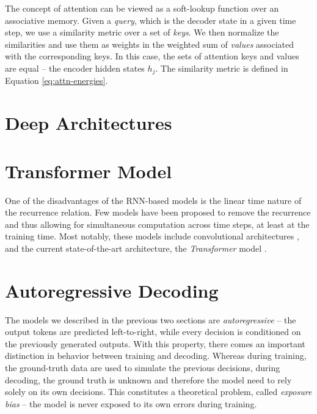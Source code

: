 The concept of attention can be viewed as a soft-lookup function over an
associative memory. Given a \emph{query}, which is the decoder state in a given
time step, we use a similarity metric over a set of \emph{keys}. We then
normalize the similarities and use them as weights in the weighted sum of
\emph{values} associated with the corresponding keys. In this case, the sets of
attention keys and values are equal -- the encoder hidden states $h_j$. The
similarity metric is defined in Equation \ref{eq:attn-energies}.


\section{Deep Architectures}
\label{sec:deep}


\section{Transformer Model}
\label{sec:transformer}

One of the disadvantages of the RNN-based models is the linear time nature of
the recurrence relation. Few models have been proposed to remove the recurrence
and thus allowing for simultaneous computation across time steps, at least at
the training time. Most notably, these models include convolutional
architectures \citep{gehring2017convolutional}, and the current state-of-the-art
architecture, the \emph{Transformer} model \citep{vaswani2017attention}.






\section{Autoregressive Decoding}
\label{sec:training-vs-inference}

The models we described in the previous two sections are \emph{autoregressive}
-- the output tokens are predicted left-to-right, while every decision is
conditioned on the previously generated outputs. With this property, there comes
an important distinction in behavior between training and decoding. Whereas
during training, the ground-truth data are used to simulate the previous
decisions, during decoding, the ground truth is unknown and therefore the model
need to rely solely on its own decisions. This constitutes a theoretical
problem, called \emph{exposure bias} -- the model is never exposed to its own
errors during training.

